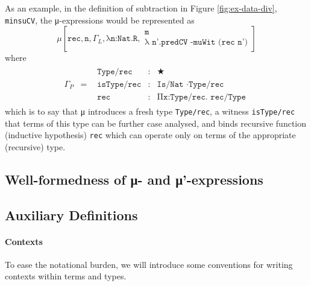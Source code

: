 \documentclass{article}
\newcommand{\musche}[5]{μ[#1,#2,#3,#4,#5]}
\begin{document}
As an example, in the definition of subtraction in Figure
\ref{fig:ex-data-div}, \texttt{minsuCV}, the μ-expressions would be represented
as
\[
  \musche{\texttt{rec}}{\texttt{n}}{\Gamma_L}{\texttt{λn:Nat.R}}
  {\begin{array}{c}
     \texttt{m}
     \\ \texttt{λ n'.predCV -muWit (rec n')}
   \end{array}
    }
\]
\noindent where
\[
  \begin{array}{lcl}
    \Gamma_P
    & =
    & \begin{array}{lcl}
        \texttt{Type/rec} & : & ★
        \\ \texttt{isType/rec} & : & \texttt{Is/Nat ·Type/rec}
        \\ \texttt{rec} & : & \texttt{Πx:Type/rec. rec/Type}
      \end{array}
  \end{array}
\]
\noindent which is to say that μ introduces a fresh type \texttt{Type/rec}, a
witness \texttt{isType/rec} that terms of this type can be further case
analysed, and binds recursive function (inductive hypothesis) \texttt{rec} which
can operate only on terms of the appropriate (recursive) type.

\subsection{Well-formedness of μ- and μ'-expressions}

\subsection{Auxiliary Definitions}
\label{ssec:inductive-aux-defs}

\paragraph{Contexts}
To ease the notational burden, we will introduce some conventions for writing
contexts within terms and types.
\end{document}

